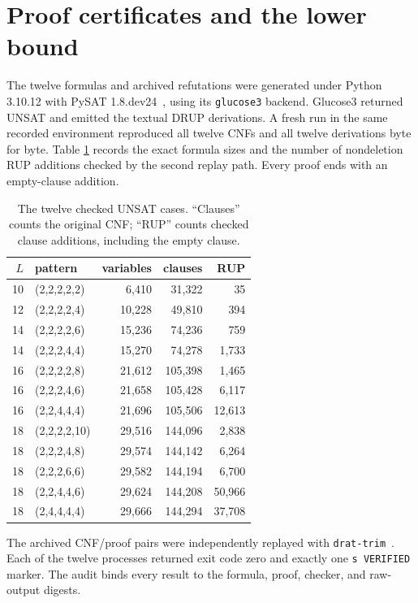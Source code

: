 \documentclass[11pt]{article}
\begin{document}
\section{Proof certificates and the lower bound}

The twelve formulas and archived refutations were generated under Python
3.10.12 with PySAT 1.8.dev24~\cite{IgnatievEtAl2018}, using its
\texttt{glucose3} backend.  Glucose3 returned UNSAT and emitted the textual
DRUP derivations.  A fresh run in the same recorded environment reproduced
all twelve CNFs and all twelve derivations byte for byte.  Table
\ref{tab:certificates} records the exact formula sizes and the number of
nondeletion RUP additions checked by the second replay path.  Every proof ends
with an empty-clause addition.

\begin{table}[ht]
\centering
\small
\caption{The twelve checked UNSAT cases.  ``Clauses'' counts the original
CNF; ``RUP'' counts checked clause additions, including the empty clause.}
\label{tab:certificates}
\begin{tabular}{r l r r r}
\toprule
\(L\)&pattern&variables&clauses&RUP\\
\midrule
10&(2,2,2,2,2)&6,410&31,322&35\\
12&(2,2,2,2,4)&10,228&49,810&394\\
14&(2,2,2,2,6)&15,236&74,236&759\\
14&(2,2,2,4,4)&15,270&74,278&1,733\\
16&(2,2,2,2,8)&21,612&105,398&1,465\\
16&(2,2,2,4,6)&21,658&105,428&6,117\\
16&(2,2,4,4,4)&21,696&105,506&12,613\\
18&(2,2,2,2,10)&29,516&144,096&2,838\\
18&(2,2,2,4,8)&29,574&144,142&6,264\\
18&(2,2,2,6,6)&29,582&144,194&6,700\\
18&(2,2,4,4,6)&29,624&144,208&50,966\\
18&(2,4,4,4,4)&29,666&144,294&37,708\\
\bottomrule
\end{tabular}
\end{table}

The archived CNF/proof pairs were independently replayed with
\texttt{drat-trim}~\cite{WetzlerHeuleHunt2014}.  Each of the twelve processes
returned exit code zero and exactly one \texttt{s VERIFIED} marker.  The audit
binds every result to the formula, proof, checker, and raw-output digests.
\end{document}
